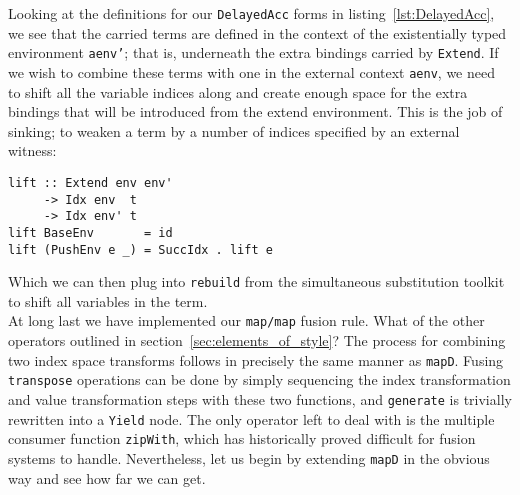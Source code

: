 Looking at the definitions for our \texttt{DelayedAcc} forms in
listing~\ref{lst:DelayedAcc}, we see that the carried terms are defined in the
context of the existentially typed environment \texttt{aenv'}; that is,
underneath the extra bindings carried by \texttt{Extend}. If we wish to combine
these terms with one in the external context \texttt{aenv}, we need to shift all
the variable indices along and create enough space for the extra bindings that
will be introduced from the extend environment. This is the job of sinking; to
weaken a term by a number of indices specified by an external witness:
%
\begin{lstlisting}[style=haskell]
lift :: Extend env env'
     -> Idx env  t
     -> Idx env' t
lift BaseEnv       = id
lift (PushEnv e _) = SuccIdx . lift e
\end{lstlisting}
%
Which we can then plug into \texttt{rebuild} from the simultaneous substitution
toolkit to shift all variables in the term.\\
%

\noindent At long last we have implemented our \texttt{map/map} fusion rule.
What of the other operators outlined in section~\ref{sec:elements_of_style}? The
process for combining two index space transforms follows in precisely the same
manner as \texttt{mapD}. Fusing \texttt{transpose} operations can be done by
simply sequencing the index transformation and value transformation steps with
these two functions, and \texttt{generate} is trivially rewritten into a
\texttt{Yield} node. The only operator left to deal with is the multiple
consumer function \texttt{zipWith}, which has historically proved difficult for
fusion systems to handle. Nevertheless, let us begin by extending
\texttt{mapD} in the obvious way and see how far we can get.

